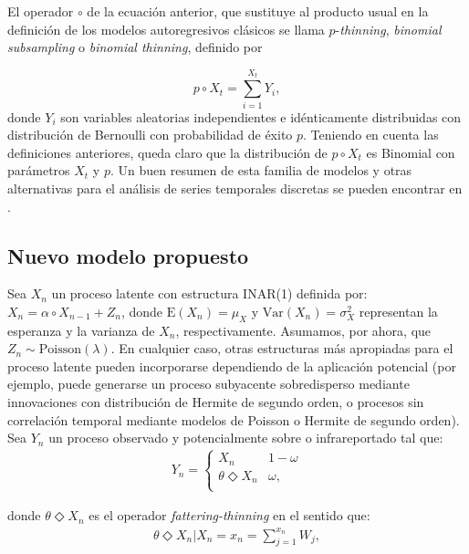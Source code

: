 \documentclass[12pt,twoside]{article} %
\begin{document}
El operador $\circ$ de la ecuación anterior, que sustituye al producto usual en la definición de los modelos autoregresivos clásicos se llama $p$-\textit{thinning}, \textit{binomial subsampling} o \textit{binomial thinning}, definido por

\begin{equation}
p \circ X_t = \sum_{i=1}^{X_t} Y_i,
\end{equation}
donde $Y_i$ son variables aleatorias independientes e idénticamente distribuidas con distribución de Bernoulli con probabilidad de éxito $p$. Teniendo en cuenta las definiciones anteriores, queda claro que la distribución de $p \circ X_t$ es Binomial con parámetros $X_t$ y $p$. Un buen resumen de esta familia de modelos y otras alternativas para el análisis de series temporales discretas se pueden encontrar en \cite{McKenzie2003}.

\subsection{Nuevo modelo propuesto}  %

Sea $X_n$ un proceso latente con estructura INAR(1) definida por: $X_n=\alpha \circ X_{n-1}+Z_n$, donde $\textrm{E}(X_n)=\mu_X$ y $\textrm{Var}(X_n)=\sigma_X^2$ representan la esperanza y la varianza de $X_n$, respectivamente. Asumamos, por ahora, que $Z_n \sim \textrm{Poisson}(\lambda)$. En cualquier caso, otras estructuras más apropiadas para el proceso latente pueden incorporarse dependiendo de la aplicación potencial (por ejemplo, puede generarse un proceso subyacente sobredisperso mediante innovaciones con distribución de Hermite de segundo orden, o procesos sin correlación temporal mediante modelos de Poisson o Hermite de segundo orden). Sea $Y_n$ un proceso observado y potencialmente sobre o infrareportado tal que: 
\begin{align}\label{eq0:modelfatthin}
 Y_n=\begin{cases} 
X_n &  1-\omega \\
\theta \Diamond X_n & \omega, \\
   \end{cases}
\end{align}

\noindent donde $\theta \Diamond X_n$ es el operador \textit{fattering-thinning} en el sentido que:
\begin{align}\label{eq1:fatteringthinning}
\theta \Diamond X_n|X_n=x_n=\sum_{j=1}^{x_n}W_j,
\end{align}
\end{document}

